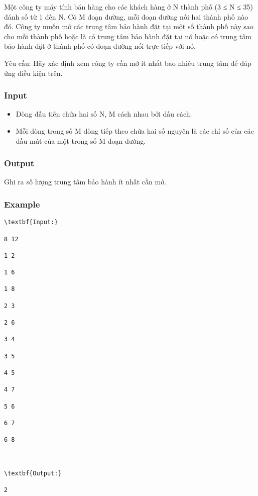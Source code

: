 

Một công ty máy tính bán hàng cho các khách hàng ở N thành phố (3 ≤ N ≤ 35) đánh số từ 1 đến N. Có M đoạn đường, mỗi đoạn đường nối hai thành phố nào đó. Công ty muốn mở các trung tâm bảo hành đặt tại một số thành phố này sao cho mỗi thành phố hoặc là có trung tâm bảo hành đặt tại nó hoặc có trung tâm bảo hành đặt ở thành phố có đoạn đường nối trực tiếp với nó.

Yêu cầu: Hãy xác định xem công ty cần mở ít nhất bao nhiêu trung tâm để đáp ứng điều kiện trên.

\subsubsection{Input}
\begin{itemize}
	\item Dòng đầu tiên chứa hai số N, M cách nhau bởi dấu cách.
	\item Mỗi dòng trong số M dòng tiếp theo chứa hai số nguyên là các chỉ số của các đầu mút của một trong số M đoạn đường.
\end{itemize}

\subsubsection{Output}

Ghi ra số lượng trung tâm bảo hành ít nhất cần mở.

\subsubsection{Example}
\begin{verbatim}
\textbf{Input:}

8 12

1 2

1 6

1 8

2 3

2 6

3 4

3 5

4 5

4 7

5 6

6 7

6 8



\textbf{Output:}

2

\end{verbatim}